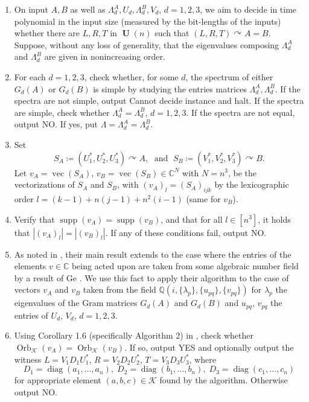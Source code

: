 \documentclass[11pt]{article}
\numberwithin{equation}{section}
\theoremstyle{remark}
\DeclareMathOperator{\diag}{diag}
\DeclareMathOperator{\Orb}{Orb}
\DeclareMathOperator{\Unitary}{\textbf{U}}
\DeclareMathOperator{\supp}{supp}
\DeclareMathOperator{\vecc}{vec}
\newcommand{\CC}{\mathbb{C}}
\newcommand{\QQ}{\mathbb{Q}}
\newcommand{\cK}{\mathcal{K}}
\begin{document}
\begin{algorithm}[H]
\caption{Deciding unitary equivalence of 3-tensors with simple spectrum.}
\label{alg:1}
    \begin{enumerate}[label=Step \arabic*]
    \item [\textbf{Input}]  On input $A, B$ as well as $\Lambda^A_d, U_d, \Lambda_d^B, V_d$, $d=1,2,3$, we aim to decide in time polynomial in the input size (measured by the bit-lengths of the inputs) whether there are $L,R,T$ in $\Unitary(n)$ such that $(L,R,T)\curvearrowright A=B$. Suppose, without any loss of generality, that the eigenvalues composing $\Lambda_d^A$ and $\Lambda_d^B$ are given in nonincreasing order.
    
    \item\label{alg1step1} For each $d=1,2,3$, check whether, for some $d$, the spectrum of either $G_d(A)$ or $G_d(B)$ is simple by studying the entries matrices $\Lambda_d^A, \Lambda_d^B$. If the spectra are not simple, output \textsf{Cannot decide instance} and halt.
    If the spectra are simple, check whether $\Lambda_d^A = \Lambda_d^B$, $d=1,2,3$. If the spectra are not equal, output \textsf{NO}. If yes, put $\Lambda = \Lambda_d^A = \Lambda_d^B$.
    
    \item\label{alg1step2} Set
    \[
    S_A\coloneqq (U_1^*, U_2^*, U_3^*) \curvearrowright A,\;\text{ and }\;
    S_B\coloneqq (V_1^*, V_2^*, V_3^*) \curvearrowright B.
    \]
    Let $v_A=\vecc(S_A),\,v_B=\vecc(S_B)\in\CC^{N}$ with $N=n^3$, be the vectorizations of $S_A$ and $S_B$, with $(v_A)_l = (S_A)_{ijk}$ by the lexicographic order $l=(k-1)+n(j-1)+n^2(i-1)$ (same for $v_B$).
    
    \item\label{alg1step3} Verify that $\supp(v_A) = \supp(v_B)$, and that for all $l\in [n^3]$, it holds that $|(v_A)_l| = |(v_B)_l|$. If any of these conditions fail, output \textsf{NO}.
    
    \item\label{alg1step4pre} As noted in \cite{burgisser_et_alCCC.2021.32}, their main result extends to the case where the entries of the elements $v \in \CC$ being acted upon are taken from some algebraic number field by a result of Ge \cite{ge1993testing}. We use this fact to apply their algorithm to the case of vectors $v_A$ and $v_B$ taken from the field $\QQ(i, \{\lambda_p\}, \{u_{pq}\}, \{v_{pq}\})$ for $\lambda_p$ the eigenvalues of the Gram matrices $G_d(A)$ and $G_d(B)$ and $u_{pq}$, $v_{pq}$ the entries of $U_d$, $V_d$, $d=1,2,3$.
    \item\label{alg1step4} Using Corollary 1.6 (specifically Algorithm 2) in \cite{burgisser_et_alCCC.2021.32}, 
    check whether $\Orb_\cK(v_A) = \Orb_\cK(v_B)$. If so, output \textsf{YES} and optionally output the witness $L = V_1 D_1 U_1^*$, $R = V_2D_2U_2^*$, $T = V_3D_3U_3^*$, where
    \[
    D_1 = \diag(a_1,\dots,a_n),\; D_2 = \diag(b_1,\dots,b_n), \; D_3 = \diag(c_1,\dots,c_n)
    \]
    for appropriate element $(a, b, c) \in \cK$ found by the algorithm.
    Otherwise output \textsf{NO}.
    \end{enumerate}
\end{algorithm}
\end{document}

